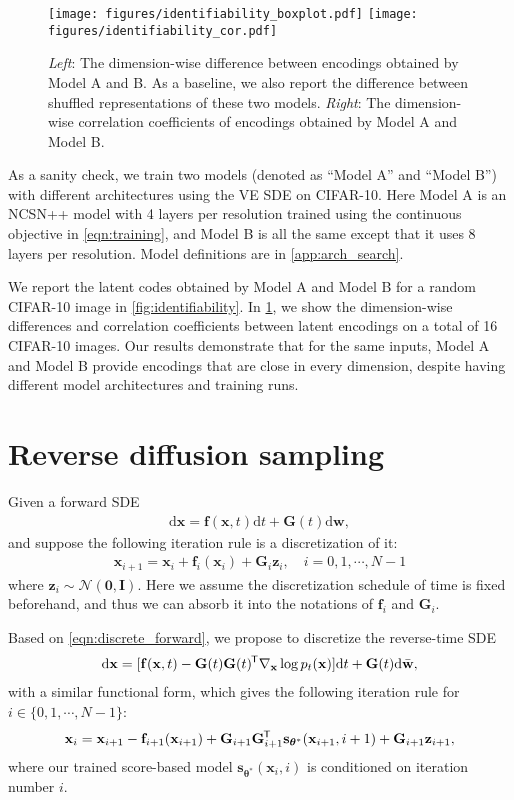 \documentclass{article} \usepackage{iclr2021_conference,times}
\newcommand*{\tran}{^{\mkern-1.5mu\mathsf{T}}}
\newcommand{\mbf}[1]{\mathbf{#1}}
\newcommand{\ud}{\mathrm{d}}
\newcommand{\mcal}{\mathcal}
\newcommand{\bfx}{\mathbf{x}}
\newcommand{\bfw}{\mathbf{w}}
\newcommand{\bfz}{\mathbf{z}}
\newcommand{\bfI}{\mathbf{I}}
\newcommand{\bff}{\mathbf{f}}
\newcommand{\bfzero}{\mathbf{0}}
\newcommand{\bftheta}{{\boldsymbol{\theta}}}
\newcommand{\bfs}{\mathbf{s}}
\newcommand{\bfG}{\mathbf{G}}
\begin{document}
\begin{figure}
    \centering
    \texttt{[image: figures/identifiability\_boxplot.pdf]}
    \texttt{[image: figures/identifiability\_cor.pdf]}
    \caption{\emph{Left}: The dimension-wise difference between encodings obtained by Model A and B. As a baseline, we also report the difference between shuffled representations of these two models.
    \emph{Right}: The dimension-wise correlation coefficients of encodings obtained by Model A and Model B.}
    \label{fig:identifiability_boxplot}
\end{figure}

As a sanity check, we train two models (denoted as ``Model A'' and ``Model B'') with different architectures using the VE SDE on CIFAR-10. Here Model A is an NCSN++ model with 4 layers per resolution trained using the continuous objective in \cref{eqn:training}, and Model B is all the same except that it uses 8 layers per resolution. Model definitions are in \cref{app:arch_search}. 

We report the latent codes obtained by Model A and Model B for a random CIFAR-10 image in \cref{fig:identifiability}. In \cref{fig:identifiability_boxplot}, we show the dimension-wise differences and correlation coefficients between latent encodings on a total of 16 CIFAR-10 images. Our results demonstrate that for the same inputs, Model A and Model B provide encodings that are close in every dimension, despite having different model architectures and training runs.


\section{Reverse diffusion sampling}\label{app:reverse_diffusion}
Given a forward SDE 
\begin{align*}
    \ud \bfx = \bff(\bfx, t) \ud t + \bfG(t) \ud \bfw,
\end{align*}
and suppose the following iteration rule is a discretization of it:
\begin{align}
    \bfx_{i+1} = \bfx_i + \bff_i(\bfx_i) + \bfG_i \bfz_i, \quad i = 0, 1, \cdots, N-1 \label{eqn:discrete_forward}
\end{align}
where $\bfz_i \sim \mcal{N}(\bfzero, \bfI)$. Here we assume the discretization schedule of time is fixed beforehand, and thus we can absorb it into the notations of $\bff_i$ and $\bfG_i$.

Based on \cref{eqn:discrete_forward}, we propose to discretize the reverse-time SDE
\begin{align*}
\ud \bfx = [\bff(\bfx, t) - \bfG(t)\bfG(t)\tran  \nabla_\bfx  \log p_t(\bfx)] \ud t + \mbf{G}(t) \ud \bar{\bfw},
\end{align*}
with a similar functional form, which gives the following iteration rule for $i \in \{0, 1, \cdots, N-1\}$:
\begin{align}
    \bfx_{i} = \bfx_{i+1} -\bff_{i+1}(\bfx_{i+1}) + \bfG_{i+1}\bfG_{i+1}\tran \bfs_{\bftheta^*}(\bfx_{i+1}, i+1) + \bfG_{i+1}\bfz_{i+1}, \label{eqn:discrete_backward}
\end{align}
where our trained score-based model $\bfs_{\bftheta^*}(\bfx_i, i)$ is conditioned on iteration number $i$.
\end{document}
